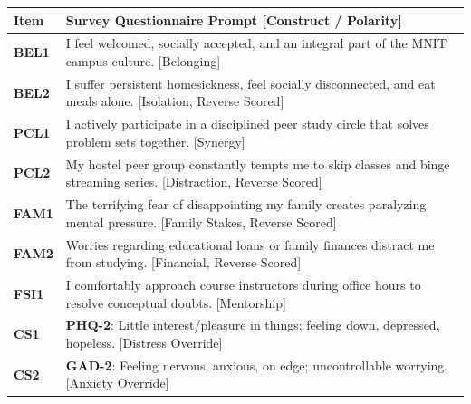 \documentclass[aspectratio=169, 10pt]{beamer}
\begin{document}
\begin{frame}
\begin{columns}[T]
    \begin{column}{0.495\textwidth}
      \begin{tcolorbox}[colback=white, colframe=BluePrimary, arc=1.5mm, boxrule=0.8pt, top=0.3mm, bottom=0.3mm, left=0.8mm, right=0.8mm, title={\scriptsize\bfseries\color{white}Quadrant 4: Relational Integration \& Clinical Safety}, colbacktitle=BluePrimary]
        \fontsize{4.5pt}{5.4pt}\selectfont
        \renewcommand{\arraystretch}{0.80}
        \begin{tabularx}{\linewidth}{@{}l X@{}}
          \toprule
          \textbf{Item} & \textbf{Survey Questionnaire Prompt [Construct / Polarity]} \\
          \midrule
          \rowcolor{BlueLight} \textbf{BEL1} & I feel welcomed, socially accepted, and an integral part of the MNIT campus culture. [Belonging] \\
          \rowcolor{BlueLight} \textbf{BEL2} & I suffer persistent homesickness, feel socially disconnected, and eat meals alone. [Isolation, Reverse Scored] \\
          \midrule
          \rowcolor{CanvasBG} \textbf{PCL1} & I actively participate in a disciplined peer study circle that solves problem sets together. [Synergy] \\
          \rowcolor{CanvasBG} \textbf{PCL2} & My hostel peer group constantly tempts me to skip classes and binge streaming series. [Distraction, Reverse Scored] \\
          \midrule
          \rowcolor{BlueLight} \textbf{FAM1} & The terrifying fear of disappointing my family creates paralyzing mental pressure. [Family Stakes, Reverse Scored] \\
          \rowcolor{BlueLight} \textbf{FAM2} & Worries regarding educational loans or family finances distract me from studying. [Financial, Reverse Scored] \\
          \midrule
          \rowcolor{CanvasBG} \textbf{FSI1} & I comfortably approach course instructors during office hours to resolve conceptual doubts. [Mentorship] \\
          \midrule
          \rowcolor{GoldBG} \textbf{CS1} & \textbf{PHQ-2}: Little interest/pleasure in things; feeling down, depressed, hopeless. [Distress Override] \\
          \rowcolor{GoldBG} \textbf{CS2} & \textbf{GAD-2}: Feeling nervous, anxious, on edge; uncontrollable worrying. [Anxiety Override] \\
          \bottomrule
        \end{tabularx}
      \end{tcolorbox}
    \end{column}
  \end{columns}
  \vspace{-0.34cm}


\end{frame}
\end{document}
